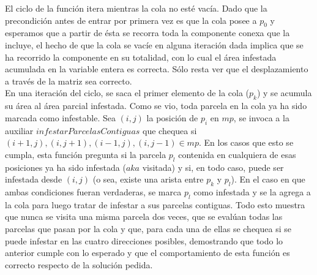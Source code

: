 \indent El ciclo de la función itera mientras la cola no esté vacía. Dado que la precondición antes de entrar por primera vez es que la cola posee a $p_{0}$ y esperamos que a partir de ésta se recorra toda la componente conexa que la incluye, el hecho de que la cola se vacíe en alguna iteración dada implica que se ha recorrido la componente en su totalidad, con lo cual el área infestada acumulada en la variable entera es correcta. Sólo resta ver que el desplazamiento a través de la matriz sea correcto.\\
\indent En una iteración del ciclo, se saca el primer elemento de la cola ($p_{k}$) y se acumula su área al área parcial infestada. Como se vio, toda parcela en la cola ya ha sido marcada como infestable. Sea $(i,j)$ la posición de $p_{i}$ en $mp$, se invoca a la auxiliar $infestarParcelasContiguas$ que chequea si $(i+1,j), (i,j+1), (i-1,j),(i,j-1) \in mp$. En los casos que esto se cumpla, esta función pregunta si la parcela $p_{l}$ contenida en cualquiera de esas posiciones ya ha sido infestada ($aka$ visitada) y si, en todo caso, puede ser infestada desde $(i,j)$ (o sea, existe una arista entre $p_{k}$ y $p_{l}$). En el caso en que ambas condiciones fueran verdaderas, se marca $p_{l}$ como infestada y se la agrega a la cola para luego tratar de infestar a sus parcelas contiguas. Todo esto muestra que nunca se visita una misma parcela dos veces, que se evalúan todas las parcelas que pasan por la cola y que, para cada una de ellas se chequea si se puede infestar en las cuatro direcciones posibles, demostrando que todo lo anterior cumple con lo esperado y que el comportamiento de esta función es correcto respecto de la solución pedida. 







